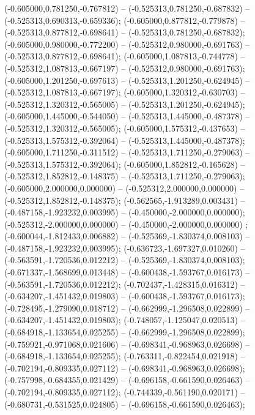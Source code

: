  (-0.605000,0.781250,-0.767812) -- (-0.525313,0.781250,-0.687832) -- (-0.525313,0.690313,-0.659336);
 (-0.605000,0.877812,-0.779878) -- (-0.525313,0.877812,-0.698641) -- (-0.525313,0.781250,-0.687832);
 (-0.605000,0.980000,-0.772200) -- (-0.525312,0.980000,-0.691763) -- (-0.525313,0.877812,-0.698641);
 (-0.605000,1.087813,-0.744778) -- (-0.525312,1.087813,-0.667197) -- (-0.525312,0.980000,-0.691763);
 (-0.605000,1.201250,-0.697613) -- (-0.525313,1.201250,-0.624945) -- (-0.525312,1.087813,-0.667197);
 (-0.605000,1.320312,-0.630703) -- (-0.525312,1.320312,-0.565005) -- (-0.525313,1.201250,-0.624945);
 (-0.605000,1.445000,-0.544050) -- (-0.525313,1.445000,-0.487378) -- (-0.525312,1.320312,-0.565005);
 (-0.605000,1.575312,-0.437653) -- (-0.525313,1.575312,-0.392064) -- (-0.525313,1.445000,-0.487378);
 (-0.605000,1.711250,-0.311512) -- (-0.525313,1.711250,-0.279063) -- (-0.525313,1.575312,-0.392064);
 (-0.605000,1.852812,-0.165628) -- (-0.525312,1.852812,-0.148375) -- (-0.525313,1.711250,-0.279063);
 (-0.605000,2.000000,0.000000) -- (-0.525312,2.000000,0.000000) -- (-0.525312,1.852812,-0.148375);
 (-0.562565,-1.913289,0.003431) -- (-0.487158,-1.923232,0.003995) -- (-0.450000,-2.000000,0.000000);
 (-0.525312,-2.000000,0.000000) -- (-0.450000,-2.000000,0.000000) ;
 (-0.600044,-1.812433,0.006882) -- (-0.525369,-1.830374,0.008103) -- (-0.487158,-1.923232,0.003995);
 (-0.636723,-1.697327,0.010260) -- (-0.563591,-1.720536,0.012212) -- (-0.525369,-1.830374,0.008103);
 (-0.671337,-1.568699,0.013448) -- (-0.600438,-1.593767,0.016173) -- (-0.563591,-1.720536,0.012212);
 (-0.702437,-1.428315,0.016312) -- (-0.634207,-1.451432,0.019803) -- (-0.600438,-1.593767,0.016173);
 (-0.728495,-1.279090,0.018712) -- (-0.662999,-1.296508,0.022899) -- (-0.634207,-1.451432,0.019803);
 (-0.748057,-1.125047,0.020513) -- (-0.684918,-1.133654,0.025255) -- (-0.662999,-1.296508,0.022899);
 (-0.759921,-0.971068,0.021606) -- (-0.698341,-0.968963,0.026698) -- (-0.684918,-1.133654,0.025255);
 (-0.763311,-0.822454,0.021918) -- (-0.702194,-0.809335,0.027112) -- (-0.698341,-0.968963,0.026698);
 (-0.757998,-0.684355,0.021429) -- (-0.696158,-0.661590,0.026463) -- (-0.702194,-0.809335,0.027112);
 (-0.744339,-0.561190,0.020171) -- (-0.680731,-0.531525,0.024805) -- (-0.696158,-0.661590,0.026463);
